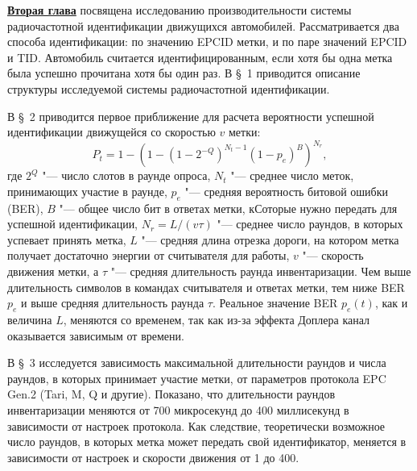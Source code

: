 

\underline{\textbf{Вторая глава}} посвящена исследованию производительности системы радиочастотной идентификации движущихся автомобилей. Рассматривается два способа идентификации: по значению EPCID метки, и по паре значений EPCID и TID. Автомобиль считается идентифицированным, если хотя бы одна метка была успешно прочитана хотя бы один раз. В \S~1 приводится описание структуры исследуемой системы радиочастотной идентификации.

В \S~2 приводится первое приближение для расчета вероятности успешной идентификации движущейся со скоростью $v$ метки:
\[
P_t = 1 - \left( 1 - (1 - 2^{-Q})^{N_t-1} (1 - p_e)^B \right)^{N_r},
\]
где $2^Q$ "--- число слотов в раунде опроса, $N_t$ "--- среднее число меток, принимающих участие в раунде, $p_e$ "--- средняя вероятность битовой ошибки (BER), $B$ "--- общее число бит в ответах метки, кСоторые нужно передать для успешной идентификации, $N_r = L / (v \tau)$ "--- среднее число раундов, в которых успевает принять метка, $L$ "--- средняя длина отрезка дороги, на котором метка получает достаточно энергии от считывателя для работы, $v$ "--- скорость движения метки, а $\tau$ "--- средняя длительность раунда инвентаризации. Чем выше длительность символов в командах считывателя и ответах метки, тем ниже BER $p_e$ и выше средняя длительность раунда $\tau$. Реальное значение BER $p_e(t)$, как и величина $L$, меняются со временем, так как из-за эффекта Доплера канал оказывается зависимым от времени.

В \S~3 исследуется зависимость максимальной длительности раундов и числа раундов, в которых принимает участие метки, от параметров протокола EPC Gen.2 (Tari, M, Q и другие). Показано, что длительности раундов инвентаризации меняются от 700 микросекунд до 400 миллисекунд в зависимости от настроек протокола. Как следствие, теоретически возможное число раундов, в которых метка может передать свой идентификатор, меняется в зависимости от настроек и скорости движения от 1 до 400.

